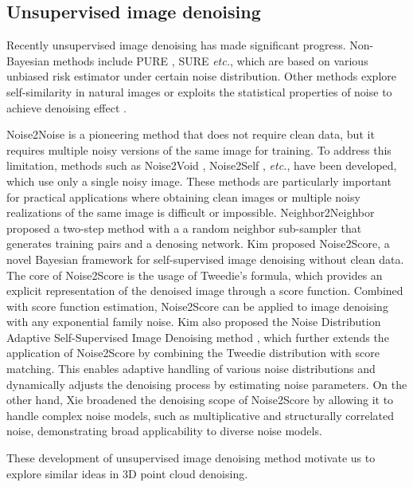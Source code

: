 \subsection{Unsupervised image denoising}
Recently unsupervised image denoising has made significant progress. Non-Bayesian methods include PURE \cite{luisier2010image}, SURE \cite{SURE2018} \textit{etc.}, which are based on various unbiased risk estimator under certain noise distribution. Other methods explore self-similarity in natural images \cite{xu2015patch, doi:10.1137/23M1614456} or exploits the statistical properties of noise to achieve denoising effect \cite{gravel2004method}.  

Noise2Noise \cite{2018Noise2NoiseLI} is a pioneering method that does not require clean data, but it requires multiple noisy versions of the same image for training. To address this limitation, methods such as Noise2Void \cite{2018Noise2VoidL}, Noise2Self \cite{2019Noise2SelfBD}, \textit{etc.}, have been developed, which use only a single noisy image. These methods are particularly important for practical applications where obtaining clean images or multiple noisy realizations of the same image is difficult or impossible. Neighbor2Neighbor \cite{huang2021neighbor2neighbor} proposed a two-step method with a a random neighbor sub-sampler that generates training  pairs and a denosing network. Kim \etal proposed Noise2Score\cite{kim_noise2score_2021}, a novel Bayesian framework for self-supervised image denoising without clean data. The core of Noise2Score is the usage of Tweedie's formula, which provides an explicit representation of the denoised image through a score function. Combined with score function estimation, Noise2Score can be applied to image denoising with any exponential family noise. Kim \etal also proposed the Noise Distribution Adaptive Self-Supervised Image Denoising method \cite{kim_noise_2022}, which further extends the application of Noise2Score by combining the Tweedie distribution with score matching. This enables adaptive handling of various noise distributions and dynamically adjusts the denoising process by estimating noise parameters. On the other hand, Xie \etal \cite{scoreXie2024} broadened the denoising scope of Noise2Score by allowing it to handle complex noise models, such as multiplicative and structurally correlated noise, demonstrating broad applicability to diverse noise models.

These development of unsupervised image denoising method motivate us to explore similar ideas in 3D point cloud denoising.



